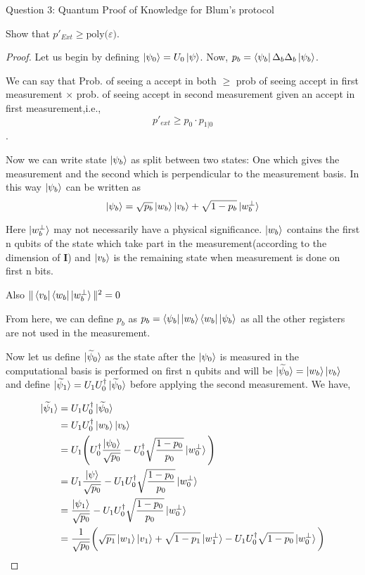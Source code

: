 \begin{solution}{Question 3: Quantum Proof of Knowledge for Blum’s protocol}\label{ques:x}
    \begin{question}
    Show that $p'_{Ext}\geq \text{poly($\varepsilon$)}$.
    \end{question}
    \tcblower{}
    \begin{proof}
    Let us begin by defining $\ket{\psi_0} = U_0\ket{\psi}$. Now, $p_b = \bra{\psi_b}\Delta_b\Delta_b\ket{\psi_b}$.

    We can say that Prob. of seeing a accept in both $\geq$ prob of seeing accept in first measurement $\times$ prob. of seeing accept in second measurement given an accept in first measurement,i.e.,
    \[p'_{ext}\geq p_0\cdot p_{1|0}\].

    Now we can write state $\ket{\psi_b}$ as split between two states: One which gives the measurement and the second which is perpendicular to the measurement basis. In this way $\ket{\psi_b}$ can be written as 
    \begin{equation}
        \ket{\psi_b} = \sqrt{p_b}\ket{w_b}\ket{v_b} + \sqrt{1-p_b}\ket{w_b^\perp}
    \end{equation}

    Here $\ket{w_b^\perp}$ may not necessarily have a physical significance. $\ket{w_b}$ contains the first n qubits of the state which take part in the measurement(according to the dimension of \textbf{I}) and $\ket{v_b}$ is the remaining state when measurement is done on first n bits.

    Also $\|\bra{v_b}\bra{w_b}\ket{w_b^\perp}\|^2 =0$ 

    From here, we can define $p_b$ as $p_b = \bra{\psi_b}\ket{w_b}\bra{w_b}\ket{\psi_b}$ as all the other registers are not used in the measurement.

    Now let us define $\ket{\widetilde{\psi}_0}$ as the state after the $\ket{\psi_0}$ is measured in the computational basis is performed on first n qubits and will be $\ket{\widetilde{\psi}_0} = \ket{w_b}\ket{v_b}$ and define $\ket{\widetilde{\psi}_1} = U_1U_0^\dag\ket{\widetilde{\psi}_0}$ before applying the second measurement. We have,

    \begin{equation*}
        \begin{split}
            \ket{\widetilde{\psi}_1} &= U_1U_0^\dag\ket{\widetilde{\psi}_0}\\
            &=U_1U_0^\dag\ket{w_b}\ket{v_b}\\
            &=U_1\Bigg(U_0^\dag\frac{\ket{\psi_0}}{\sqrt{p_0}} - U_0^\dag\sqrt{\frac{1-p_0}{p_0}}\ket{w_0^\perp} \Bigg)\\
            &=U_1\frac{\ket{\psi}}{\sqrt{p_0}}-U_1U_0^\dag\sqrt{\frac{1-p_0}{p_0}}\ket{w_0^\perp}\\
            &= \frac{\ket{\psi_1}}{\sqrt{p_0}}-U_1U_0^\dag\sqrt{\frac{1-p_0}{p_0}}\ket{w_0^\perp}\\
            &= \frac{1}{\sqrt{p_0}}\bigg(\sqrt{p_1}\ket{w_1}\ket{v_1} + \sqrt{1-p_1}\ket{w_1^\perp}- U_1U_0^\dag\sqrt{1-p_0}\ket{w_0^\perp} \bigg)
        \end{split}
    \end{equation*}


\end{proof}
\end{solution}
